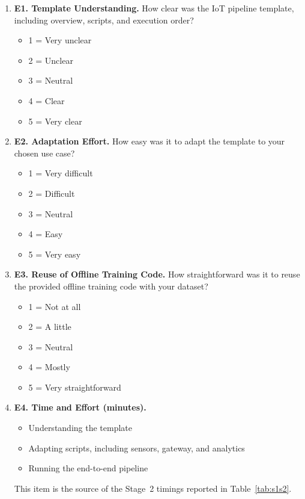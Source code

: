 \begin{enumerate}[leftmargin=*]
    \item \textbf{E1. Template Understanding.}
    How clear was the IoT pipeline template, including overview, scripts, and execution order?
    \begin{itemize}
        \item 1 = Very unclear
        \item 2 = Unclear
        \item 3 = Neutral
        \item 4 = Clear
        \item 5 = Very clear
    \end{itemize}

    \item \textbf{E2. Adaptation Effort.}
    How easy was it to adapt the template to your chosen use case?
    \begin{itemize}
        \item 1 = Very difficult
        \item 2 = Difficult
        \item 3 = Neutral
        \item 4 = Easy
        \item 5 = Very easy
    \end{itemize}

    \item \textbf{E3. Reuse of Offline Training Code.}
    How straightforward was it to reuse the provided offline training code with your dataset?
    \begin{itemize}
        \item 1 = Not at all
        \item 2 = A little
        \item 3 = Neutral
        \item 4 = Mostly
        \item 5 = Very straightforward
    \end{itemize}

    \item \textbf{E4. Time and Effort (minutes).}
    \begin{itemize}
        \item Understanding the template
        \item Adapting scripts, including sensors, gateway, and analytics
        \item Running the end-to-end pipeline
    \end{itemize}
    This item is the source of the Stage~2 timings reported in Table~\ref{tab:s1s2}.


\end{enumerate}
